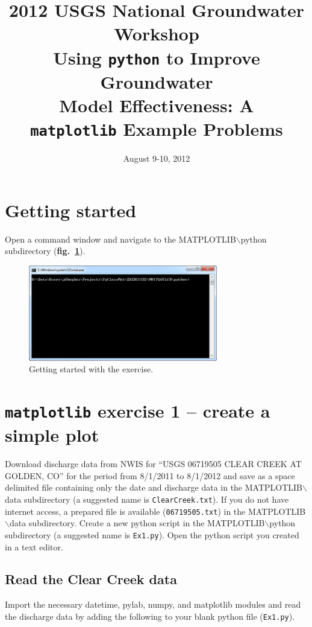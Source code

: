 \documentclass[12pt]{article}
\title{2012 USGS National Groundwater Workshop \\ Using \texttt{python} to Improve Groundwater \\ Model Effectiveness: A \\ \texttt{matplotlib} Example Problems}
\author{}
\date{August 9-10, 2012}
\begin{document}
\maketitle

\section{Getting started}
Open a command window and navigate to the MATPLOTLIB$\backslash$python subdirectory (\textbf{fig.~\ref{FigGettingStarted}}).

\begin{figure}
	\centering
  	\includegraphics[width=8.25cm]{figures/GettingStarted.png}
 	\caption{Getting started with the exercise.}
	\label{FigGettingStarted}
\end{figure}

\section{\texttt{matplotlib} exercise 1 -- create a simple plot}
Download discharge data from NWIS for ``USGS 06719505 CLEAR CREEK AT GOLDEN, CO'' for the period from 8/1/2011 to 8/1/2012 and save as a space delimited file containing only the date and discharge data in the MATPLOTLIB$\backslash$data subdirectory (a suggested name is \texttt{ClearCreek.txt}). If you do not have internet access, a prepared file is available (\texttt{06719505.txt}) in the MATPLOTLIB$\backslash$data subdirectory. Create a new python script in the MATPLOTLIB$\backslash$python subdirectory (a suggested name is \texttt{Ex1.py}). Open the python script you created in a text editor.

\subsection{Read the Clear Creek data}
Import the necessary datetime, pylab, numpy, and matplotlib modules and read the discharge data by adding the following to your blank python file (\texttt{Ex1.py}).

\begin{center}
	
\end{center}
\end{document}
